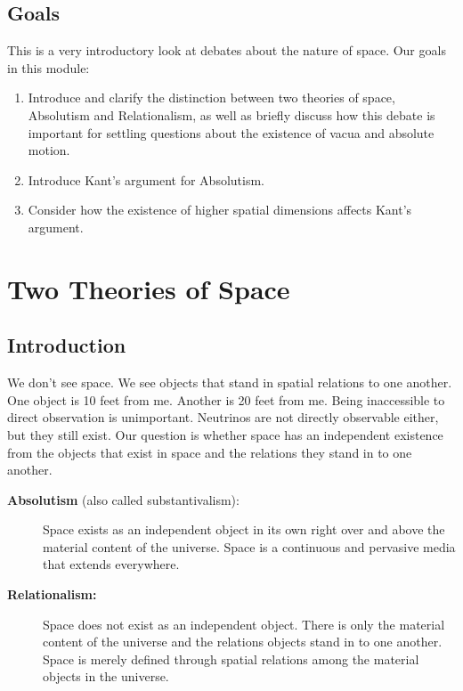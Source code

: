\documentclass[oneside]{article}
\begin{document}
\thispagestyle{fancy}

\subsection*{Goals}

This is a very introductory look at debates about the nature of space.
Our goals in this module:

\begin{enumerate}

\item
  Introduce and clarify the distinction between two theories of space,
  Absolutism and Relationalism, as well as briefly discuss how this
  debate is important for settling questions about the existence of
  vacua and absolute motion.
\item
  Introduce Kant's argument for Absolutism.
\item
  Consider how the existence of higher spatial dimensions affects Kant's
  argument.
\end{enumerate}

\section*{Two Theories of Space}

\subsection*{Introduction}

We don't see space. We see objects that stand in spatial relations to
one another. One object is 10 feet from me. Another is 20 feet from me.
Being inaccessible to direct observation is unimportant. Neutrinos are
not directly observable either, but they still exist. Our question is
whether space has an independent existence from the objects that exist
in space and the relations they stand in to one another.

\begin{description}
\item[\textbf{Absolutism} (also called substantivalism):]
Space exists as an independent object in its own right over and above
the material content of the universe. Space is a continuous and
pervasive media that extends everywhere.
\item[\textbf{Relationalism:}]
Space does not exist as an independent object. There is only the
material content of the universe and the relations objects stand in to
one another. Space is merely defined through spatial relations among the
material objects in the universe.
\end{description}
\end{document}
